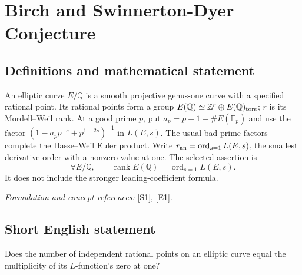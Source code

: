 \documentclass[11pt]{article}
\begin{document}
\section*{\texorpdfstring{Birch and Swinnerton-Dyer Conjecture}{Birch and Swinnerton-Dyer Conjecture}}\label{5}
\subsection{Definitions and mathematical statement}
An elliptic curve $E/{\mathbb{Q}}$ is a smooth projective genus-one curve with a specified rational point. Its rational points form a group $E({\mathbb{Q}})\simeq{\mathbb{Z}}^r\oplus E({\mathbb{Q}})_{\rm tors}$; $r$ is its Mordell--Weil rank. At a good prime $p$, put $a_p=p+1-\#E({\mathbb{F}}_p)$ and use the factor $(1-a_pp^{-s}+p^{1-2s})^{-1}$ in $L(E,s)$. The usual bad-prime factors complete the Hasse--Weil Euler product. Write $r_{\rm an}=\operatorname{ord}_{s=1}L(E,s)$, the smallest derivative order with a nonzero value at one. The selected assertion is
\[
 \forall E/{\mathbb{Q}},\qquad \operatorname{rank}E({\mathbb{Q}})=\operatorname{ord}_{s=1}L(E,s).
\]
It does not include the stronger leading-coefficient formula.
\par\smallskip\textit{Formulation and concept references:} \href{https://www.claymath.org/library/monographs/MPPc.pdf}{[S1]}, \href{https://www.claymath.org/wp-content/uploads/2022/05/birchswin.pdf}{[E1]}.

\subsection{Short English statement}
Does the number of independent rational points on an elliptic curve equal the multiplicity of its $L$-function's zero at one?
\end{document}
